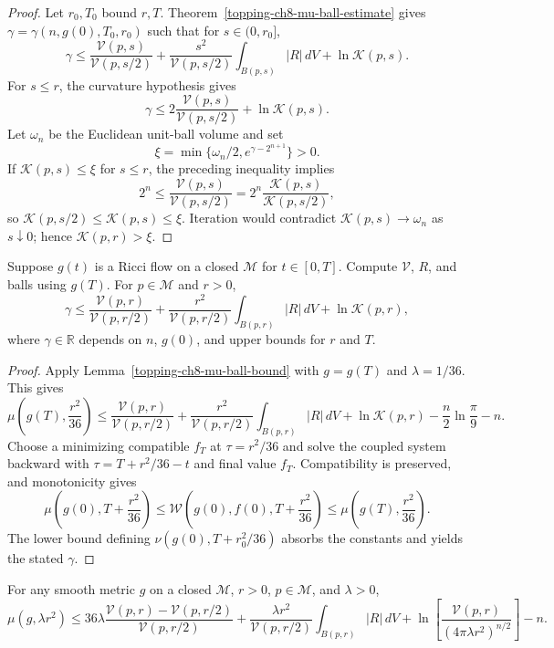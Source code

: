 \begin{proof}
\sketch Let $r_0,T_0$ bound $r,T$. Theorem~\ref{topping-ch8-mu-ball-estimate} gives
$\gamma=\gamma(n,g(0),T_0,r_0)$ such that for $s\in(0,r_0]$,
\[
\gamma\leq\frac{\mathcal V(p,s)}{\mathcal V(p,s/2)}
+\frac{s^2}{\mathcal V(p,s/2)}\int_{B(p,s)}|R|\,dV+\ln\mathcal K(p,s).
\]
For $s\leq r$, the curvature hypothesis gives
\[
\gamma\leq2\frac{\mathcal V(p,s)}{\mathcal V(p,s/2)}+\ln\mathcal K(p,s).
\]
Let $\omega_n$ be the Euclidean unit-ball volume and set
\[
\xi=\min\{\omega_n/2,e^{\gamma-2^{n+1}}\}>0.
\]
If $\mathcal K(p,s)\leq\xi$ for $s\leq r$, the preceding inequality implies
\[
2^n\leq\frac{\mathcal V(p,s)}{\mathcal V(p,s/2)}
=2^n\frac{\mathcal K(p,s)}{\mathcal K(p,s/2)},
\]
so $\mathcal K(p,s/2)\leq\mathcal K(p,s)\leq\xi$. Iteration would contradict
$\mathcal K(p,s)\to\omega_n$ as $s\downarrow0$; hence
$\mathcal K(p,r)>\xi$.
\end{proof}

\begin{theorem}
\label{topping-ch8-mu-ball-estimate}

Suppose $g(t)$ is a Ricci flow on a closed $\mathcal M$ for $t\in[0,T]$.
Compute $\mathcal V$, $R$, and balls using $g(T)$. For $p\in\mathcal M$ and
$r>0$,
\[
\gamma\leq\frac{\mathcal V(p,r)}{\mathcal V(p,r/2)}
+\frac{r^2}{\mathcal V(p,r/2)}\int_{B(p,r)}|R|\,dV
+\ln\mathcal K(p,r),
\]
where $\gamma\in\mathbb R$ depends on $n$, $g(0)$, and upper bounds for $r$
and $T$.
\end{theorem}

\begin{proof}
\sketch Apply Lemma~\ref{topping-ch8-mu-ball-bound} with $g=g(T)$ and $\lambda=1/36$. This gives
\[
\mu\left(g(T),\frac{r^2}{36}\right)
\leq\frac{\mathcal V(p,r)}{\mathcal V(p,r/2)}
+\frac{r^2}{\mathcal V(p,r/2)}\int_{B(p,r)}|R|\,dV
+\ln\mathcal K(p,r)-\frac n2\ln\frac\pi9-n.
\]
Choose a minimizing compatible $f_T$ at $\tau=r^2/36$ and solve the coupled
system backward with $\tau=T+r^2/36-t$ and final value $f_T$. Compatibility is
preserved, and monotonicity gives
\[
\mu\left(g(0),T+\frac{r^2}{36}\right)
\leq\mathcal W\left(g(0),f(0),T+\frac{r^2}{36}\right)
\leq\mu\left(g(T),\frac{r^2}{36}\right).
\]
The lower bound defining $\nu(g(0),T+r_0^2/36)$ absorbs the constants and
yields the stated $\gamma$.
\end{proof}

\begin{lemma}
\label{topping-ch8-mu-ball-bound}

For any smooth metric $g$ on a closed $\mathcal M$, $r>0$, $p\in\mathcal M$,
and $\lambda>0$,
\[
\mu(g,\lambda r^2)\leq36\lambda
\frac{\mathcal V(p,r)-\mathcal V(p,r/2)}{\mathcal V(p,r/2)}
+\frac{\lambda r^2}{\mathcal V(p,r/2)}\int_{B(p,r)}|R|\,dV
+\ln\left[\frac{\mathcal V(p,r)}{(4\pi\lambda r^2)^{n/2}}\right]-n.
\]
\end{lemma}

